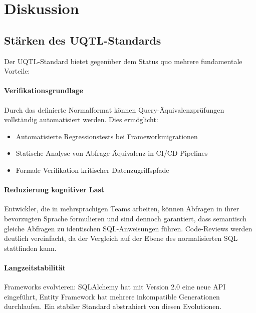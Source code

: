﻿%
\section{Diskussion}
\label{sec:diskussion}

\subsection{Stärken des UQTL-Standards}
\label{subsec:staerken}

Der UQTL-Standard bietet gegenüber dem Status quo mehrere fundamentale
Vorteile:

\paragraph{Verifikationsgrundlage}
Durch das definierte Normalformat können Query-Äquivalenz\-prüfungen vollständig
automatisiert werden. Dies ermöglicht:
\begin{itemize}[leftmargin=1.5cm]
  \item Automatisierte Regressionstests bei Frameworkmigrationen
  \item Statische Analyse von Abfrage-Äquivalenz in CI/CD-Pipelines
  \item Formale Verifikation kritischer Datenzugriffspfade
\end{itemize}

\paragraph{Reduzierung kognitiver Last}
Entwickler, die in mehrsprachigen Teams arbeiten, können Abfragen in ihrer
bevorzugten Sprache formulieren und sind dennoch garantiert, dass semantisch
gleiche Abfragen zu identischen SQL-Anweisungen führen. Code-Reviews werden
deutlich vereinfacht, da der Vergleich auf der Ebene des normalisierten SQL
stattfinden kann.

\paragraph{Langzeitstabilität}
Frameworks evolvieren: SQLAlchemy hat mit Version 2.0 eine neue API eingeführt,
Entity Framework hat mehrere inkompatible Generationen durchlaufen. Ein
stabiler Standard abstrahiert von diesen Evolutionen.


